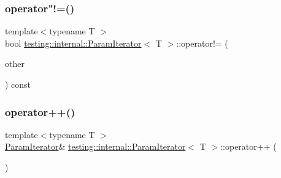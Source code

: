\mbox{\label{classtesting_1_1internal_1_1_param_iterator_a7a6aee04e8e44b5c8294929951cfac2b}} 
\subsubsection{\texorpdfstring{operator"!=()}{operator!=()}\hspace{0.1cm}{\footnotesize\ttfamily [3/3]}}
{\footnotesize\ttfamily template$<$typename T $>$ \\
bool \mbox{\hyperlink{classtesting_1_1internal_1_1_param_iterator}{testing\+::internal\+::\+Param\+Iterator}}$<$ T $>$\+::operator!= (\begin{DoxyParamCaption}\item[{const \mbox{\hyperlink{classtesting_1_1internal_1_1_param_iterator}{Param\+Iterator}}$<$ T $>$ \&}]{other }\end{DoxyParamCaption}) const\hspace{0.3cm}{\ttfamily [inline]}}

\mbox{\label{classtesting_1_1internal_1_1_param_iterator_ab0922f2f554fb3beaf13c442da605e8d}} 
\subsubsection{\texorpdfstring{operator++()}{operator++()}\hspace{0.1cm}{\footnotesize\ttfamily [1/6]}}
{\footnotesize\ttfamily template$<$typename T $>$ \\
\mbox{\hyperlink{classtesting_1_1internal_1_1_param_iterator}{Param\+Iterator}}\& \mbox{\hyperlink{classtesting_1_1internal_1_1_param_iterator}{testing\+::internal\+::\+Param\+Iterator}}$<$ T $>$\+::operator++ (\begin{DoxyParamCaption}{ }\end{DoxyParamCaption})\hspace{0.3cm}{\ttfamily [inline]}}

